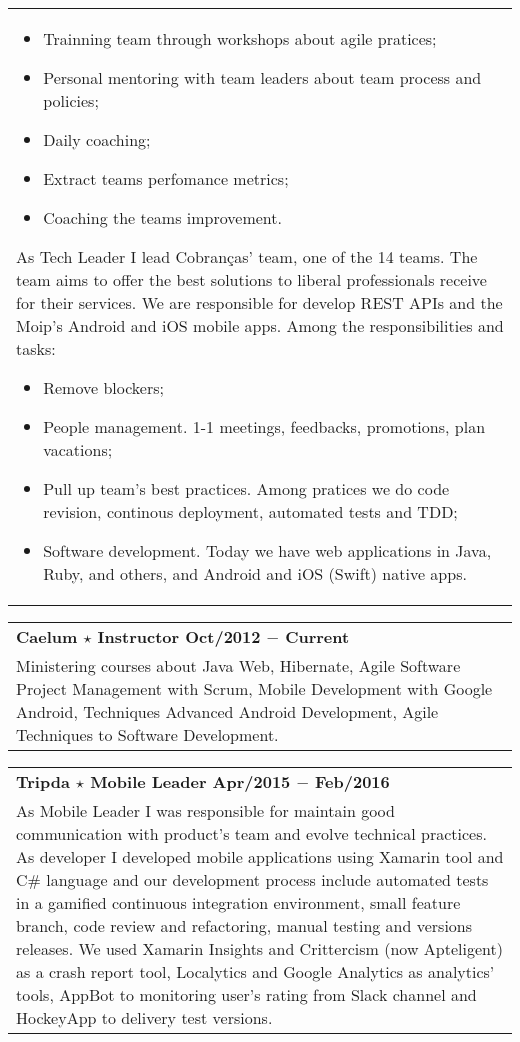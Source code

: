 \documentclass[a4paper, oneside, final]{scrartcl}
\newcommand{\vspc}{\vspace{0.15cm}} %
\begin{document}
\begin{center}
\begin{tabularx}{1\linewidth}{X}
\begin{itemize}[noitemsep,topsep=0pt]
  \item Trainning team through workshops about agile pratices;
  \item Personal mentoring with team leaders about team process and policies;
  \item Daily coaching;
  \item Extract teams perfomance metrics;
  \item Coaching the teams improvement.
\end{itemize}

As Tech Leader I lead Cobranças' team, one of the 14 teams. The team aims to offer the best solutions to liberal professionals receive for their services. We are responsible for develop REST APIs and the Moip's Android and iOS mobile apps. Among the responsibilities and tasks:

\begin{itemize}[noitemsep,topsep=0pt]
  \item Remove blockers;
  \item People management. 1-1 meetings, feedbacks, promotions, plan vacations;
  \item Pull up team's best practices. Among pratices we do code revision, continous deployment, automated tests and TDD;
  \item Software development. Today we have web applications in Java, Ruby, and others, and Android and iOS (Swift) native apps.
\end{itemize}

\end{tabularx}

\begin{tabularx}{1\linewidth}{X}
{\bf Caelum $\star$ Instructor \hfill Oct/2012 $-$ Current} \\
Ministering courses about Java Web, Hibernate, Agile Software Project Management with Scrum, Mobile Development with Google Android, Techniques Advanced Android Development, Agile Techniques to Software Development. \vspc\\
\end{tabularx}

\begin{tabularx}{1\linewidth}{X}
{\bf Tripda $\star$ Mobile Leader \hfill Apr/2015 $-$ Feb/2016} \\
As Mobile Leader I was responsible for maintain good communication with product's team and evolve technical practices. As developer I developed mobile applications using Xamarin tool and C\# language and our development process include automated tests in a gamified continuous integration environment, small feature branch, code review and refactoring, manual testing and versions releases. We used Xamarin Insights and Crittercism (now Apteligent) as a crash report tool, Localytics and Google Analytics as analytics' tools, AppBot to monitoring user's rating from Slack channel and HockeyApp to delivery test versions. \vspc\\
\end{tabularx}


\end{center}
\end{document}
